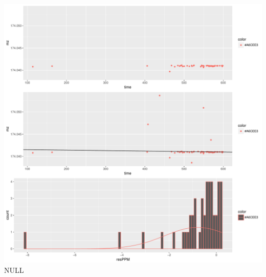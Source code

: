 \documentclass[]{article}
\begin{document}
\includegraphics{Supplementary_document_files/figure-latex/filter.lm.174-1.pdf}
NULL
\end{document}
